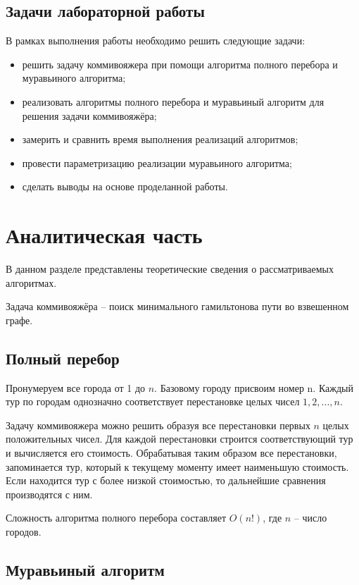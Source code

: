 \documentclass[12pt]{report}
\begin{document}
\section*{Задачи лабораторной работы}
	
В рамках выполнения работы необходимо решить следующие задачи:
	
\begin{itemize}
	\item решить задачу коммивояжера при помощи алгоритма полного перебора и муравьиного алгоритма;
	\item реализовать алгоритмы полного перебора и муравьиный алгоритм для решения задачи коммивояжёра;
	\item замерить и сравнить время выполнения реализаций алгоритмов;
	\item провести параметризацию реализации муравьиного алгоритма;
	\item сделать выводы на основе проделанной работы.
\end{itemize}

\chapter{Аналитическая часть}
	
В данном разделе представлены теоретические сведения о рассматриваемых алгоритмах.

Задача коммивояжёра -- поиск минимального гамильтонова пути во взвешенном графе.

\section{Полный перебор}

Пронумеруем все города от 1 до $n$. Базовому городу присвоим номер n. Каждый тур по городам однозначно соответствует перестановке целых чисел $1, 2, ..., n$.

Задачу коммивояжера можно решить образуя все перестановки первых $n$ целых положительных чисел. Для каждой перестановки строится соответствующий тур и вычисляется его стоимость. Обрабатывая таким образом все перестановки, запоминается тур, который к текущему моменту имеет наименьшую стоимость. Если находится тур с более низкой стоимостью, то дальнейшие сравнения производятся с ним.

Сложность алгоритма полного перебора составляет $O(n!)$, где $n$ -- число городов.
	
\section{Муравьиный алгоритм}
\end{document}
